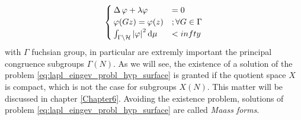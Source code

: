 \begin{equation}
\label{eq:lapl_eingev_probl_hyp_surface}
\begin{cases}
\operatorname{\Delta}\varphi+\lambda\varphi&=0\\
\varphi(Gz)=\varphi(z)&;\forall G\in\Gamma\\
\int_{\Gamma\setminus\mathcal{H}}\left| \varphi\right|^{2}\mathop{}\!\mathrm{d}\mu &<infty
\end{cases}
\end{equation}
with $\Gamma$ fuchsian group, in particular are extremly important the principal congruence subgroups $\Gamma(N)$. As we will see, the existence of a solution of the problem \ref{eq:lapl_eingev_probl_hyp_surface} is granted if the quotient space $X$ is compact, which is not the case for subgroups $X(N)$. This matter will be discussed in chapter \ref{Chapter6}. Avoiding the existence problem, solutions of problem \ref{eq:lapl_eingev_probl_hyp_surface} are called \emph{Maass forms}. 










